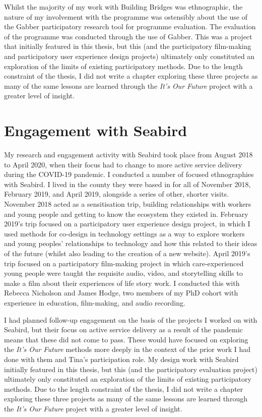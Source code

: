 Whilst the majority of my work with Building Bridges was ethnographic, the nature of my involvement with the programme was ostensibly about the use of the Gabber \cite{rainey_gabber:_2019} participatory research tool for programme evaluation. The evaluation of the programme was conducted through the use of Gabber. This was a project that initially featured in this thesis, but this (and the participatory film-making and participatory user experience design projects) ultimately only constituted an exploration of the limits of existing participatory methods. Due to the length constraint of the thesis, I did not write a chapter exploring these three projects as many of the same lessons are learned through the \textit{It's Our Future} project with a greater level of insight.

\section{Engagement with Seabird}
My research and engagement activity with Seabird took place from August 2018 to April 2020, when their focus had to change to more active service delivery during the COVID-19 pandemic. I conducted a number of focused ethnographies with Seabird. I lived in the county they were based in for all of November 2018, February 2019, and April 2019, alongside a series of other, shorter visits. November 2018 acted as a sensitisation trip, building relationships with workers and young people and getting to know the ecosystem they existed in. February 2019's trip focused on a participatory user experience design project, in which I used methods for co-design in technology settings as a way to explore workers and young peoples' relationships to technology and how this related to their ideas of the future (whilst also leading to the creation of a new website). April 2019's trip focused on a participatory film-making project in which care-experienced young people were taught the requisite audio, video, and storytelling skills to make a film about their experiences of life story work. I conducted this with Rebecca Nicholson and James Hodge, two members of my PhD cohort with experience in education, film-making, and audio recording. 

I had planned follow-up engagement on the basis of the projects I worked on with Seabird, but their focus on active service delivery as a result of the pandemic means that these did not come to pass. These would have focused on exploring the \textit{It's Our Future} methods more deeply in the context of the prior work I had done with them and Tina's participation role. My design work with Seabird initially featured in this thesis, but this (and the participatory evaluation project) ultimately only constituted an exploration of the limits of existing participatory methods. Due to the length constraint of the thesis, I did not write a chapter exploring these three projects as many of the same lessons are learned through the \textit{It's Our Future} project with a greater level of insight.

